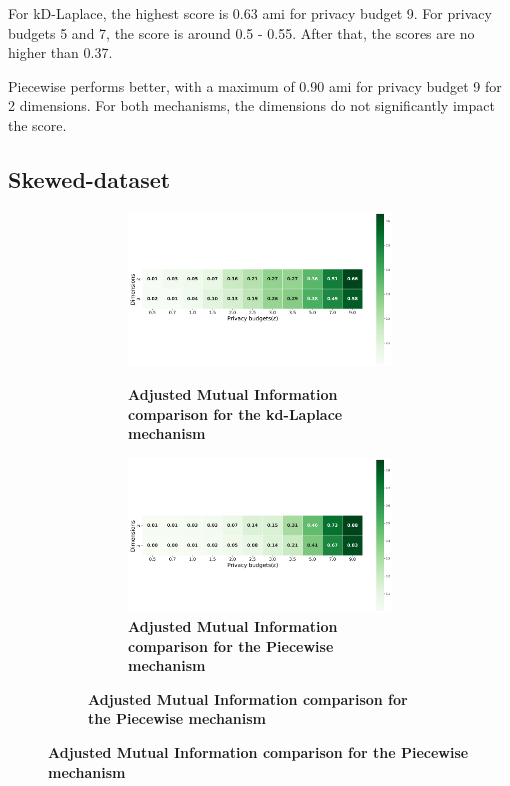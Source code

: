 For kD-Laplace, the highest score is 0.63 \gls{ami} for privacy budget 9. For privacy budgets 5 and 7, the score is around 0.5 - 0.55. After that, the scores are no higher than 0.37.

Piecewise performs better, with a maximum of 0.90 \gls{ami} for privacy budget 9 for 2 dimensions. For both mechanisms, the dimensions do not significantly impact the score.
\newpage
\subsection{Skewed-dataset}
\begin{figure}[H]
  \centering
  \begin{subfigure}[b]{0.85\textwidth}
    \begin{subfigure}[c]{1\textwidth}
      \caption{\textbf{Adjusted Mutual Information comparison for the kd-Laplace mechanism}}
      \includegraphics[width=1\textwidth]{Results/kd-laplace/kd-Laplace/skewed-dataset/ami.png}
      \label{fig:ami_skewed-dataset_comparison_kdlaplace_2d}
    \end{subfigure}
    \vfill %
    \begin{subfigure}[c]{1\textwidth}
      \caption{\textbf{Adjusted Mutual Information comparison for the Piecewise mechanism}}
      \includegraphics[width=1\textwidth]{Results/kd-laplace/piecewise/skewed-dataset/ami.png}

\end{subfigure}
\end{subfigure}
\end{figure}
